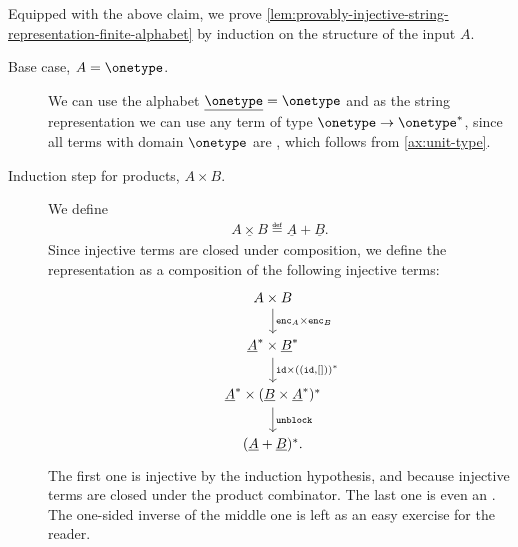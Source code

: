     Equipped with the above claim, we prove \cref{lem:provably-injective-string-representation-finite-alphabet} by induction on the structure of the input  $A$.
    \begin{description}
    \item[Base case, $A = \onetype$.] We can use the alphabet $\underline \onetype = \onetype$ and as the string representation we can use any  term of type $\onetype \to \onetype^*$, since all terms with domain $\onetype$ are , which follows from \cref{ax:unit-type}.

    \item[Induction step for products, $A \times B$.] We define 
    \begin{align*}
    \underline{A \times B} \eqdef \underline A + \underline B.
    \end{align*}
    Since injective  terms are closed under composition, we define the representation as a composition of the following injective  terms:
    \[
    \begin{tikzcd}
    A \times B 
    \ar[d,  "{\stringrep A \times \stringrep B}"] \\
    \underline A^* \times \underline B^* 
    \ar[d,
    "{\idterm \times ((\idterm,[]))^*}"]\\
    \underline A^* \times (\underline B \times \underline A^*)^* 
    \ar[d,"\unblockterm"] \\
    (\underline A + \underline B)^*.
    \end{tikzcd}
    \]
    The first one is injective by the induction hypothesis, and because injective terms are closed under the product combinator. The last one is even an . The one-sided inverse of the middle one is left as an easy exercise for the reader. 


\end{description}
